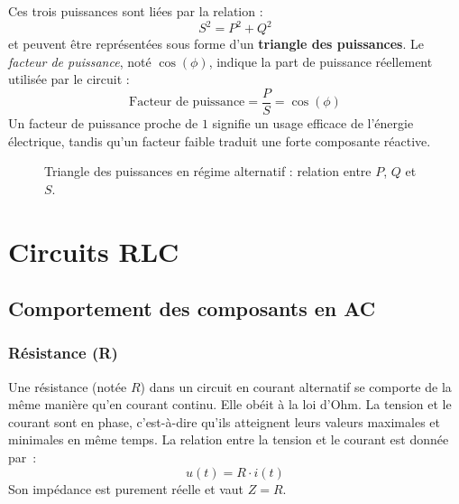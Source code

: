 Ces trois puissances sont li\'ees par la relation :
\[
S^2 = P^2 + Q^2
\]
et peuvent être repr\'esent\'ees sous forme d’un \textbf{triangle des puissances}.
Le \emph{facteur de puissance}, not\'e $\cos(\phi)$, indique la part de puissance r\'eellement utilis\'ee par le circuit :
\[
\text{Facteur de puissance} = \frac{P}{S} = \cos(\phi)
\]
Un facteur de puissance proche de \(1\) signifie un usage efficace de l’\'energie \'electrique, tandis qu’un facteur faible traduit une forte composante r\'eactive.
\begin{figure}[h!]
\centering
{}
\caption{Triangle des puissances en r\'egime alternatif : relation entre $P$, $Q$ et $S$.}
\label{fig:triangle_puissances}
\end{figure}

\section{Circuits RLC} \label{subsec:rlc_circuits}
\subsection{Comportement des composants en AC}
\subsubsection{Résistance (R)}
Une r\'esistance (not\'ee \(R\)) dans un circuit en courant alternatif se comporte de la m\^eme mani\`ere qu'en courant continu. Elle ob\'eit à la loi d'Ohm. La tension et le courant sont en phase, c'est-à-dire qu'ils atteignent leurs valeurs maximales et minimales en m\^eme temps. La relation entre la tension et le courant est donn\'ee par~:
\[u(t) = R \cdot i(t)\]
Son imp\'edance est purement r\'eelle et vaut \(Z = R\).

